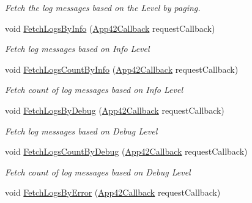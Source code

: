 \begin{DoxyCompactItemize}
\begin{DoxyCompactList}\small\item\em Fetch the log messages based on the Level by paging. \end{DoxyCompactList}\item 
void \hyperlink{classcom_1_1shephertz_1_1app42_1_1paas_1_1sdk_1_1windows_1_1log_1_1_log_service_a544b49207e733da32508683ccfcf58f1}{Fetch\+Logs\+By\+Info} (\hyperlink{interfacecom_1_1shephertz_1_1app42_1_1paas_1_1sdk_1_1windows_1_1_app42_callback}{App42\+Callback} request\+Callback)
\begin{DoxyCompactList}\small\item\em Fetch log messages based on Info Level \end{DoxyCompactList}\item 
void \hyperlink{classcom_1_1shephertz_1_1app42_1_1paas_1_1sdk_1_1windows_1_1log_1_1_log_service_a1eeae85956ca2b7c0a42a35c268519d8}{Fetch\+Logs\+Count\+By\+Info} (\hyperlink{interfacecom_1_1shephertz_1_1app42_1_1paas_1_1sdk_1_1windows_1_1_app42_callback}{App42\+Callback} request\+Callback)
\begin{DoxyCompactList}\small\item\em Fetch count of log messages based on Info Level \end{DoxyCompactList}\item 
void \hyperlink{classcom_1_1shephertz_1_1app42_1_1paas_1_1sdk_1_1windows_1_1log_1_1_log_service_a3a58b249c2a15a538dc05668a92cb739}{Fetch\+Logs\+By\+Debug} (\hyperlink{interfacecom_1_1shephertz_1_1app42_1_1paas_1_1sdk_1_1windows_1_1_app42_callback}{App42\+Callback} request\+Callback)
\begin{DoxyCompactList}\small\item\em Fetch log messages based on Debug Level \end{DoxyCompactList}\item 
void \hyperlink{classcom_1_1shephertz_1_1app42_1_1paas_1_1sdk_1_1windows_1_1log_1_1_log_service_ad10734ab74ac6cf2928ca518e613509c}{Fetch\+Logs\+Count\+By\+Debug} (\hyperlink{interfacecom_1_1shephertz_1_1app42_1_1paas_1_1sdk_1_1windows_1_1_app42_callback}{App42\+Callback} request\+Callback)
\begin{DoxyCompactList}\small\item\em Fetch count of log messages based on Debug Level \end{DoxyCompactList}\item 
void \hyperlink{classcom_1_1shephertz_1_1app42_1_1paas_1_1sdk_1_1windows_1_1log_1_1_log_service_ae6187dbeafe0ad790891fb7e2c074acd}{Fetch\+Logs\+By\+Error} (\hyperlink{interfacecom_1_1shephertz_1_1app42_1_1paas_1_1sdk_1_1windows_1_1_app42_callback}{App42\+Callback} request\+Callback)

\end{DoxyCompactItemize}

